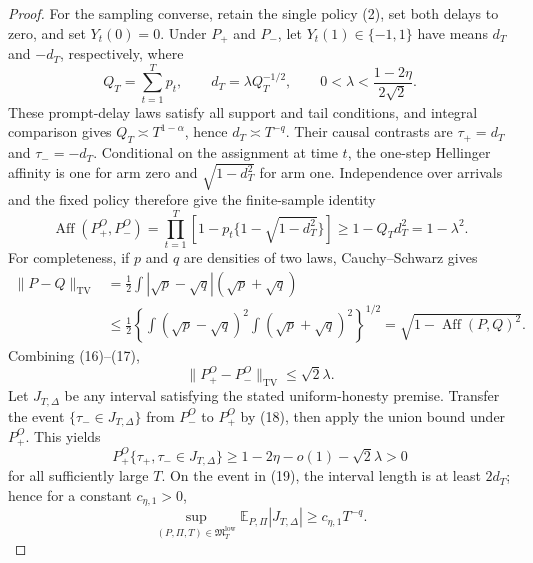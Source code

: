 \documentclass{article}
\begin{document}
\begin{proof}
For the sampling converse, retain the single policy (2), set both delays to zero, and set \(Y_t(0)=0\).  Under \(P_+\) and \(P_-\), let \(Y_t(1)\in\{-1,1\}\) have means \(d_T\) and \(-d_T\), respectively, where
\[
 Q_T=\sum_{t=1}^T p_t,
 \qquad d_T=\lambda Q_T^{-1/2},
 \qquad 0<\lambda<\frac{1-2\eta}{2\sqrt2}.
 \tag{15}
\]
These prompt-delay laws satisfy all support and tail conditions, and integral comparison gives \(Q_T\asymp T^{1-\alpha}\), hence \(d_T\asymp T^{-q}\).  Their causal contrasts are \(\tau_+=d_T\) and \(\tau_-=-d_T\).  Conditional on the assignment at time \(t\), the one-step Hellinger affinity is one for arm zero and \(\sqrt{1-d_T^2}\) for arm one.  Independence over arrivals and the fixed policy therefore give the finite-sample identity
\[
 \operatorname{Aff}(P_+^O,P_-^O)
 =\prod_{t=1}^T\left[1-p_t\{1-\sqrt{1-d_T^2}\}\right]
 \geq1-Q_Td_T^2=1-\lambda^2.
 \tag{16}
\]
For completeness, if \(p\) and \(q\) are densities of two laws, Cauchy--Schwarz gives
\[
 \begin{aligned}
 \|P-Q\|_{\mathrm{TV}}
 &=\frac12\int|\sqrt p-\sqrt q|(\sqrt p+\sqrt q)\\
 &\leq\frac12
 \left\{\int(\sqrt p-\sqrt q)^2
             \int(\sqrt p+\sqrt q)^2\right\}^{1/2}
 =\sqrt{1-\operatorname{Aff}(P,Q)^2}.
 \end{aligned}
 \tag{17}
\]
Combining (16)--(17),
\[
 \|P_+^O-P_-^O\|_{\mathrm{TV}}\leq\sqrt2\lambda.
 \tag{18}
\]
Let \(J_{T,\Delta}\) be any interval satisfying the stated uniform-honesty premise.  Transfer the event \(\{\tau_-\in J_{T,\Delta}\}\) from \(P_-^O\) to \(P_+^O\) by (18), then apply the union bound under \(P_+^O\).  This yields
\[
 P_+^O\{\tau_+,\tau_-\in J_{T,\Delta}\}
 \geq1-2\eta-o(1)-\sqrt2\lambda>0
 \tag{19}
\]
for all sufficiently large \(T\).  On the event in (19), the interval length is at least \(2d_T\); hence for a constant \(c_{\eta,1}>0\),
\[
 \sup_{(P,\Pi,T)\in\mathfrak M_T^{\mathrm{low}}}
 \mathbb E_{P,\Pi}|J_{T,\Delta}|
 \geq c_{\eta,1}T^{-q}.
 \tag{20}
\]


\end{proof}
\end{document}
